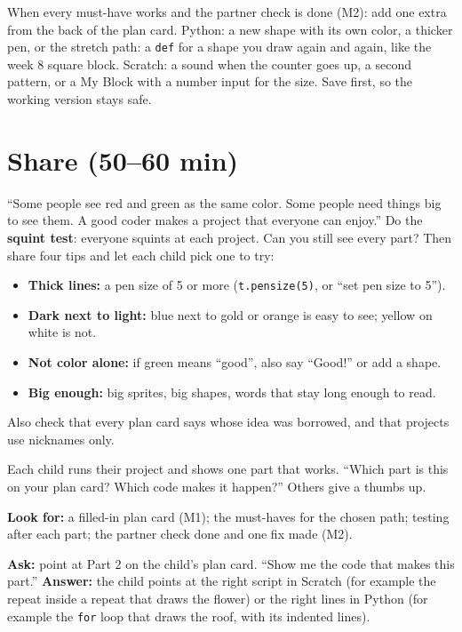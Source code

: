\begin{freebuild}
When every must-have works and the partner check is done (M2): add one extra from the back of the plan card. Python: a new shape with its own color, a thicker pen, or the stretch path: a \texttt{def} for a shape you draw again and again, like the week 8 square block. Scratch: a sound when the counter goes up, a second pattern, or a My Block with a number input for the size. Save first, so the working version stays safe.
\end{freebuild}

\section{Share (50--60 min)}
\begin{safety}
\enquote{Some people see red and green as the same color. Some people need things big to see them. A good coder makes a project that everyone can enjoy.} Do the \textbf{squint test}: everyone squints at each project. Can you still see every part? Then share four tips and let each child pick one to try:
\begin{itemize}[leftmargin=1.2em,itemsep=0pt]
  \item \textbf{Thick lines:} a pen size of 5 or more (\texttt{t.pensize(5)}, or \enquote{set pen size to 5}).
  \item \textbf{Dark next to light:} blue next to gold or orange is easy to see; yellow on white is not.
  \item \textbf{Not color alone:} if green means \enquote{good}, also say \enquote{Good!} or add a shape.
  \item \textbf{Big enough:} big sprites, big shapes, words that stay long enough to read.
\end{itemize}
Also check that every plan card says whose idea was borrowed, and that projects use nicknames only.
\end{safety}

\begin{teacherscript}
Each child runs their project and shows one part that works. \enquote{Which part is this on your plan card? Which code makes it happen?} Others give a thumbs up.
\end{teacherscript}

\begin{formativecheck}
\textbf{Look for:} a filled-in plan card (M1); the must-haves for the chosen path; testing after each part; the partner check done and one fix made (M2).

\textbf{Ask:} point at Part 2 on the child's plan card. \enquote{Show me the code that makes this part.}
\textbf{Answer:} the child points at the right script in Scratch (for example the repeat inside a repeat that draws the flower) or the right lines in Python (for example the \texttt{for} loop that draws the roof, with its indented lines).
\end{formativecheck}

